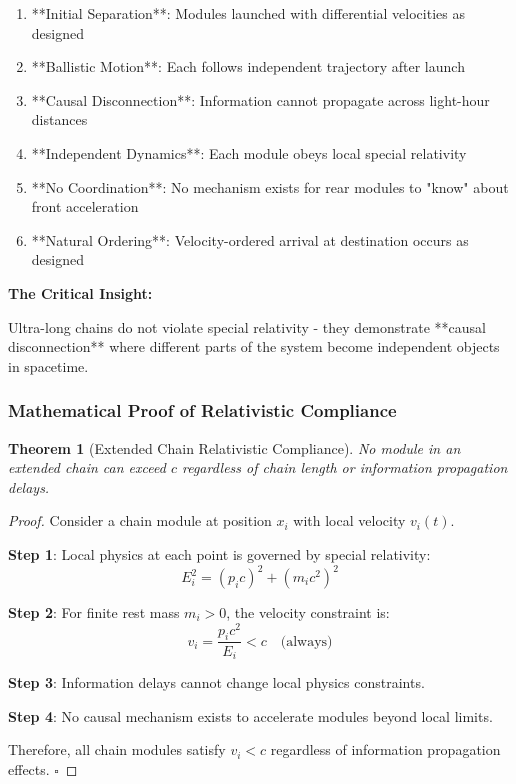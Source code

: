 \documentclass[11pt,a4paper]{article}
\newtheorem{theorem}{Theorem}[section]
\theoremstyle{remark}
\begin{document}
\begin{enumerate}
\item **Initial Separation**: Modules launched with differential velocities as designed
\item **Ballistic Motion**: Each follows independent trajectory after launch
\item **Causal Disconnection**: Information cannot propagate across light-hour distances
\item **Independent Dynamics**: Each module obeys local special relativity
\item **No Coordination**: No mechanism exists for rear modules to "know" about front acceleration
\item **Natural Ordering**: Velocity-ordered arrival at destination occurs as designed
\end{enumerate}

\textbf{The Critical Insight:}

Ultra-long chains do not violate special relativity - they demonstrate **causal disconnection** where different parts of the system become independent objects in spacetime.

\subsubsection{Mathematical Proof of Relativistic Compliance}

\begin{theorem}[Extended Chain Relativistic Compliance]
No module in an extended chain can exceed $c$ regardless of chain length or information propagation delays.
\end{theorem}

\begin{proof}
Consider a chain module at position $x_i$ with local velocity $v_i(t)$.

\textbf{Step 1}: Local physics at each point is governed by special relativity:
\begin{equation}
E_i^2 = (p_i c)^2 + (m_i c^2)^2
\end{equation}

\textbf{Step 2}: For finite rest mass $m_i > 0$, the velocity constraint is:
\begin{equation}
v_i = \frac{p_i c^2}{E_i} < c \quad \text{(always)}
\end{equation}

\textbf{Step 3}: Information delays cannot change local physics constraints.

\textbf{Step 4}: No causal mechanism exists to accelerate modules beyond local limits.

Therefore, all chain modules satisfy $v_i < c$ regardless of information propagation effects. $\square$
\end{proof}
\end{document}
